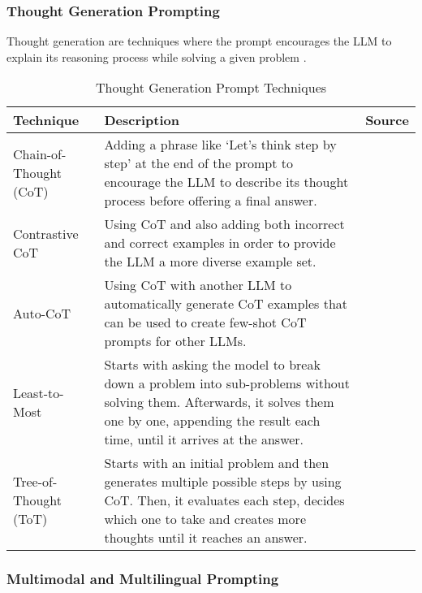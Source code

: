 \FloatBarrier{}

\subsubsection{Thought Generation Prompting}

Thought generation are techniques where the prompt encourages the LLM to explain its reasoning process while solving a given problem \parencite{prompt1}.

\begin{table}[h!]
    \centering
    \begin{tabular}{p{3cm} p{8cm} p{2cm}}
        \toprule
        \textbf{Technique} & \textbf{Description} & \textbf{Source} \\
        \midrule
        \raggedright
        Chain-of-Thought (CoT) & Adding a phrase like `Let's think step by step' at the end of the prompt to encourage the LLM to describe its thought process before offering a final answer. & \textcite{cot} \\
        \hline
        \raggedright
        Contrastive CoT & Using CoT and also adding both incorrect and correct examples in order to provide the LLM a more diverse example set.  & \textcite{contrastive-cot} \\
        \hline
        \raggedright
        Auto-CoT & Using CoT with another LLM to automatically generate CoT examples that can be used to create few-shot CoT prompts for other LLMs. &  \textcite{auto-cot} \\
        \hline
        \raggedright
        Least-to-Most & Starts with asking the model to break down a problem into sub-problems without solving them. Afterwards, it solves them one by one, appending the result each time, until it arrives at the answer. & \textcite{least-most} \\
        \hline
        \raggedright
        Tree-of-Thought (ToT) & Starts with an initial problem and then generates multiple possible steps by using CoT. Then, it evaluates each step, decides which one to take and creates more thoughts until it reaches an answer. & \textcite{treeofthought} \\
        \bottomrule
    \end{tabular}
    \caption{Thought Generation Prompt Techniques}\label{tab:thought_gen}
\end{table}

\FloatBarrier{}

\subsubsection{Multimodal and Multilingual Prompting}

